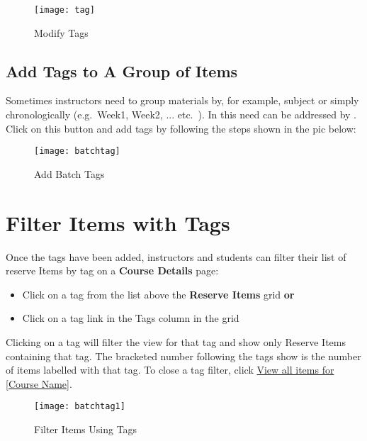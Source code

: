 \vspace*{4ex}
\begin{figure}[h]
    \centering
    \texttt{[image: tag]}
    \caption{Modify Tags}
    \label{fig:tag}
\end{figure}
\vspace*{2ex}

\subsection{Add Tags to A Group of Items}
Sometimes instructors need to group materials by, for example, subject or simply chronologically (e.g.\ Week1, Week2, ... etc.\ ). In \ares this need can be addressed by  . Click on this button and add tags by following the steps shown in the pic below:
\vspace*{4ex}
\begin{figure}[h]
    \centering
    \texttt{[image: batchtag]}
    \caption{Add Batch Tags}
    \label{fig:batchtag}
\end{figure}
\vspace*{2ex}

\section{Filter Items with Tags}
Once the tags have been added, instructors and students can filter their list of reserve Items by tag on a \textbf{Course Details} page:
\begin{itemize}
    \item Click on a tag from the list above the \textbf{Reserve Items} grid \textbf{or}
    \item Click on a tag link in the Tags column in the grid
\end{itemize}

Clicking on a tag will filter the view for that tag and show only Reserve Items containing that tag. The bracketed number following the tags show is the number of items labelled with that tag. To close a tag filter, click \uline{View all items for [Course Name]}.
\vspace*{4ex}
\begin{figure}[h]
    \centering
    \texttt{[image: batchtag1]}
    \caption{Filter Items Using Tags}
    \label{fig:filter}
\end{figure}







